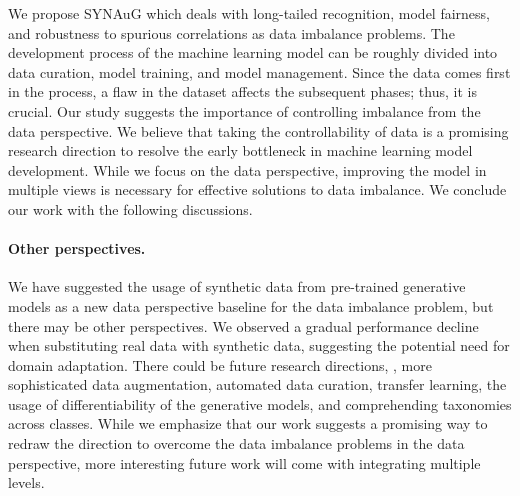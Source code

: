 
We propose SYNAuG which deals with long-tailed recognition, model fairness, and robustness to spurious correlations as data imbalance problems.
The development process of the machine learning model 
can be roughly divided into 
data curation, model training, and model management.
Since the data comes first in the process,
a flaw in the dataset affects the subsequent phases; thus, it is crucial.
Our study suggests the importance of controlling imbalance from the data perspective.
We believe that taking the controllability of data is a promising research direction to resolve the early bottleneck in machine learning model development. 
While we focus on the data perspective, improving the model in multiple views is necessary for effective solutions to data imbalance.
We conclude our work with the following discussions.

\paragraph{Other perspectives.}
We have suggested the usage of synthetic data from pre-trained generative models as a new data perspective baseline for the data imbalance problem, but there may be other perspectives.
We observed a gradual performance decline when substituting real data with synthetic data, suggesting the potential need for domain adaptation.
There could be future research directions, \eg, more sophisticated data augmentation, automated data curation, transfer learning, the usage of differentiability of the generative models, and comprehending taxonomies across classes.
While we emphasize that our work suggests a promising way to redraw the direction to overcome the data imbalance problems in the data perspective, more interesting future work will come with integrating multiple levels.


